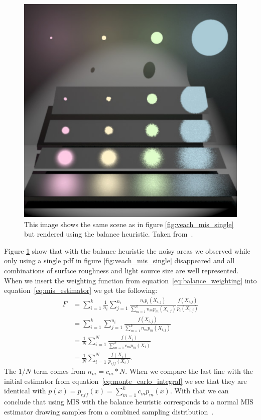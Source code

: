 \begin{figure}[h]
    \centering
    \includegraphics[width=.45\textwidth]{images/veach_mis_both.png}
    \caption{This image shows the same scene as in figure \ref{fig:veach_mis_single} but rendered using the balance heuristic.
    Taken from~\cite[Figure~9.4]{veach-thesis}.}
    \label{fig:veach_mis_balance}
\end{figure}

Figure \ref{fig:veach_mis_balance} show that with the balance heuristic the noisy areas we observed
while only using a single pdf in figure \ref{fig:veach_mis_single} disappeared
and all combinations of surface roughness and light source size are well represented.
When we insert the weighting function from equation~\ref{eq:balance_weighting} into equation~\ref{eq:mis_estimator}
we get the following:
\begin{equation*}
\begin{aligned}
    F &= \sum_{i = 1}^k \frac{1}{n_i} \sum_{j = 1}^{n_i} \frac{n_i p_i(X_{i,j})}{\sum_{m = 1}^k n_m p_m(X_{i,j})} \frac{f(X_{i,j})}{p_i(X_{i,j})}\\
    &= \sum_{i = 1}^k \sum_{j = 1}^{n_i} \frac{f(X_{i,j})}{\sum_{m = 1}^k n_m p_m(X_{i,j})}\\
    &= \frac{1}{N} \sum_{i = 1}^N \frac{f(X_{i})}{\sum_{m = 1}^k c_m p_m(X_{i})}\\
    &=\frac{1}{N} \sum_{i = 1}^N \frac{f(X_{i})}{p_{eff}(X_i)}.
\end{aligned}
\end{equation*}
The $ 1 / N $ term comes from $ n_m = c_m * N $.
When we compare the last line with the initial estimator from equation~\ref{eq:monte_carlo_integral}
we see that they are identical with $ p(x) = p_{eff}(x) = \sum_{m = 1}^k c_m p_m(x) $.
With that we can conclude that using MIS with the balance heuristic
corresponds to a normal MIS estimator drawing samples from a combined sampling distribution~\cite[Chapter~9.2.2.1]{veach-thesis}.